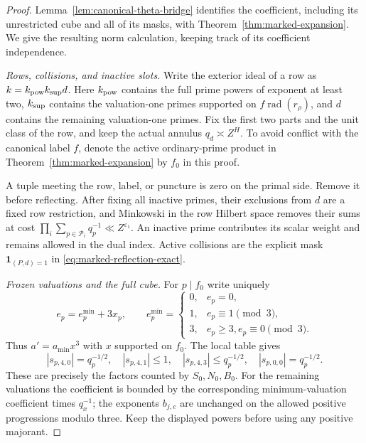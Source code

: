 \documentclass[11pt,a4paper]{article}
\numberwithin{equation}{section}
\theoremstyle{definition}
\theoremstyle{remark}
\newcommand{\eps}{\varepsilon}
\newcommand{\rad}{\operatorname{rad}}
\newcommand{\ind}{\mathbf 1}
\begin{document}
\begin{proof}
Lemma~\ref{lem:canonical-theta-bridge} identifies the coefficient,
including its unrestricted cube and all of its masks, with
Theorem~\ref{thm:marked-expansion}.  We give the resulting norm
calculation, keeping track of its coefficient independence.

\emph{Rows, collisions, and inactive slots.}
Write the exterior ideal of a row as
$k=k_{\rm pow}k_{\rm sup}d$.  Here $k_{\rm pow}$ contains the full
prime powers of exponent at least two, $k_{\rm sup}$ contains the
valuation-one primes supported on $f\rad(r_\rho)$, and $d$ contains
the remaining valuation-one primes.  Fix the first two parts and the
unit class of the row, and keep the actual annulus $q_d\asymp Z^H$.
To avoid conflict with the canonical label $f$, denote the active
ordinary-prime product in Theorem~\ref{thm:marked-expansion} by $f_0$
in this proof.

A tuple meeting the row, label, or puncture is zero on the primal
side.  Remove it before reflecting.  After fixing all inactive
primes, their exclusions from $d$ are a fixed row restriction, and
Minkowski in the row Hilbert space removes their sums at cost
$\prod_i\sum_{p\in\mathcal P_i}q_p^{-1}\ll Z^{\eps_1}$.
An inactive prime contributes its scalar weight and remains allowed
in the dual index.  Active collisions
are the explicit mask $\ind_{(P,d)=1}$ in
\eqref{eq:marked-reflection-exact}.

\emph{Frozen valuations and the full cube.}
For $p\mid f_0$ write uniquely
\[
 e_p=e_p^{\min}+3x_p,\qquad
 e_p^{\min}=\begin{cases}
 0,&e_p=0,\\1,&e_p\equiv1\pmod3,\\3,&e_p\ge3,	e_p\equiv0\pmod3.
 \end{cases}
\]
Thus $a'=a_{\min}x^3$ with $x$ supported on $f_0$.
The local table gives
\[
 |s_{p,4,0}|=q_p^{-1/2},\quad
 |s_{p,4,1}|\le1,\quad |s_{p,4,3}|\le q_p^{-1/2},\quad
 |s_{p,0,0}|=q_p^{-1/2}.
\]
These are precisely the factors counted by $S_0,N_0,B_0$.
For the remaining valuations the coefficient is bounded by the
corresponding minimum-valuation coefficient times $q_x^{-1}$;
the exponents $b_{j,e}$ are unchanged on the allowed positive
progressions modulo three.  Keep the displayed powers before using
any positive majorant.


\end{proof}
\end{document}
